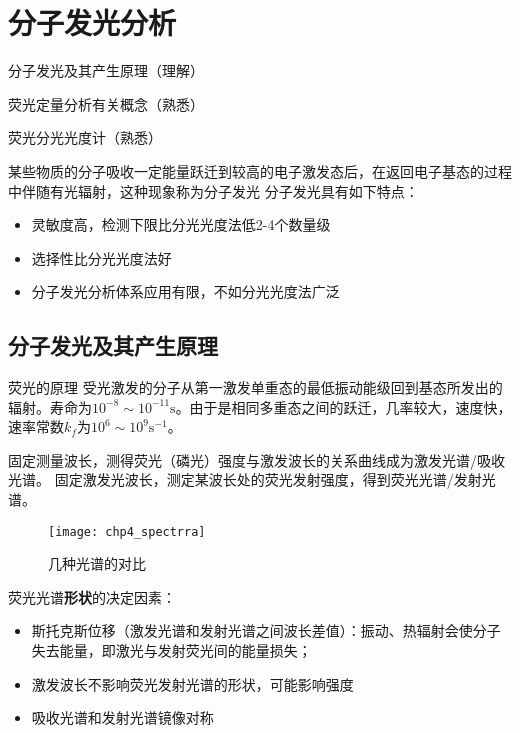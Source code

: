 \chapter{分子发光分析}

\begin{introduction}
	\item 分子发光及其产生原理（理解）
	\item 荧光定量分析有关概念（熟悉）
	\item 荧光分光光度计（熟悉）
\end{introduction}


某些物质的分子吸收一定能量跃迁到较高的电子激发态后，在返回电子基态的过程中伴随有光辐射，这种现象称为分子发光
分子发光具有如下特点：
\begin{itemize}
	\item 灵敏度高，检测下限比分光光度法低2-4个数量级
	\item 选择性比分光光度法好
	\item 分子发光分析体系应用有限，不如分光光度法广泛
\end{itemize}
\section{分子发光及其产生原理}

\begin{definition*}{荧光的原理}
	受光激发的分子从第一激发单重态的最低振动能级回到基态所发出的辐射。寿命为$10^{-8} \sim 10^{-11}\mathrm{s}$。由于是相同多重态之间的跃迁，几率较大，速度快，速率常数$k_f$为$10^{6}\sim 10^{9} \mathrm{s}^{-1}$。
\end{definition*}
固定测量波长，测得荧光（磷光）强度与激发波长的关系曲线成为激发光谱/吸收光谱。
固定激发光波长，测定某波长处的荧光发射强度，得到荧光光谱/发射光谱。

\begin{figure}[!h]
	\centering
	\texttt{[image: chp4\_spectrra]}
	\label{fig:chp4_spectrra}
	\caption{几种光谱的对比}
\end{figure}
荧光光谱\textbf{形状}的决定因素：
\begin{itemize}
	\item 斯托克斯位移（激发光谱和发射光谱之间波长差值）：振动、热辐射会使分子失去能量，即激光与发射荧光间的能量损失；
	\item 激发波长不影响荧光发射光谱的形状，可能影响强度
	\item 吸收光谱和发射光谱镜像对称
\end{itemize}

